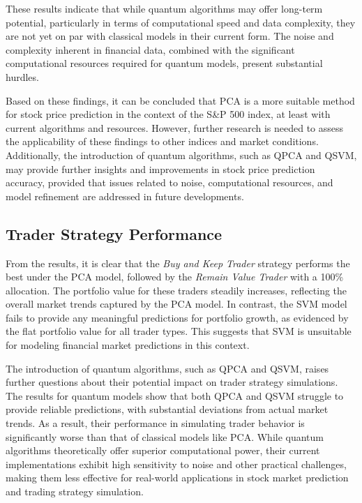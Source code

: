 \documentclass[journal]{IEEEtran}
\begin{document}
These results indicate that while quantum algorithms may offer long-term potential, particularly in terms of computational speed and data complexity, they are not yet on par with classical models in their current form. The noise and complexity inherent in financial data, combined with the significant computational resources required for quantum models, present substantial hurdles.

Based on these findings, it can be concluded that PCA is a more suitable method for stock price prediction in the context of the S\&P 500 index, at least with current algorithms and resources. However, further research is needed to assess the applicability of these findings to other indices and market conditions. Additionally, the introduction of quantum algorithms, such as QPCA and QSVM, may provide further insights and improvements in stock price prediction accuracy, provided that issues related to noise, computational resources, and model refinement are addressed in future developments.

\subsection{Trader Strategy Performance}

From the results, it is clear that the \textit{Buy and Keep Trader} strategy performs the best under the PCA model, followed by the \textit{Remain Value Trader} with a 100\% allocation. The portfolio value for these traders steadily increases, reflecting the overall market trends captured by the PCA model. In contrast, the SVM model fails to provide any meaningful predictions for portfolio growth, as evidenced by the flat portfolio value for all trader types. This suggests that SVM is unsuitable for modeling financial market predictions in this context.

The introduction of quantum algorithms, such as QPCA and QSVM, raises further questions about their potential impact on trader strategy simulations. The results for quantum models show that both QPCA and QSVM struggle to provide reliable predictions, with substantial deviations from actual market trends. As a result, their performance in simulating trader behavior is significantly worse than that of classical models like PCA. While quantum algorithms theoretically offer superior computational power, their current implementations exhibit high sensitivity to noise and other practical challenges, making them less effective for real-world applications in stock market prediction and trading strategy simulation.
\end{document}
